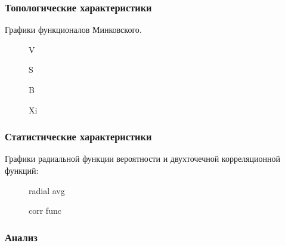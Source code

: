 		\subsubsection{Топологические характеристики}
		
			Графики функционалов Минковского.
			
			\begin{figure}[h!]
				\caption{V}
				\label{V}
			\end{figure}
		
			\begin{figure}[h!]
				\caption{S}
				\label{S}
			\end{figure}
	
			\begin{figure}[h!]
				\caption{B}
				\label{B}
			\end{figure}
			
			\begin{figure}[h!]
				\caption{Xi}
				\label{Xi}
			\end{figure}
		
		\subsubsection{Статистические характеристики}
			
			Графики радиальной функции вероятности и двухточечной корреляционной функций:
			
			\begin{figure}[h!]
				\caption{radial avg}
				\label{radial_avg}
			\end{figure}
			
			\begin{figure}[h!]
				\caption{corr func}
				\label{corr_func}
			\end{figure}
		
		\subsubsection{Анализ}
